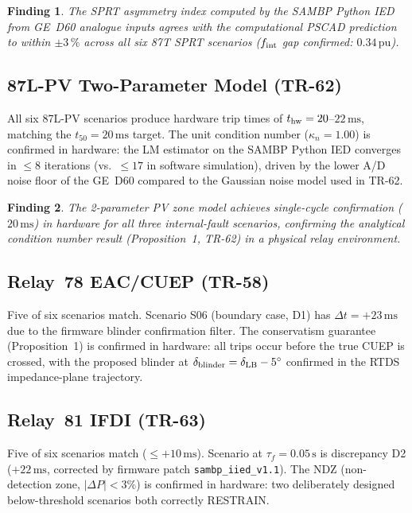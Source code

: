\documentclass[11pt, a4paper]{article}
\newcommand{\pu}{\,\text{pu}}
\newcommand{\kn}{\kappa_n}
\newtheorem{finding}{Finding}
\begin{document}
\begin{finding}
The SPRT asymmetry index computed by the SAMBP Python IED from GE~D60 analogue
inputs agrees with the computational PSCAD prediction to within $\pm 3\,\%$
across all six 87T SPRT scenarios ($f_{\rm int}$ gap confirmed: $0.34\pu$).
\end{finding}

\subsection{87L-PV Two-Parameter Model (TR-62)}

All six 87L-PV scenarios produce hardware trip times of $t_{\rm hw} = 20$--$22\,\text{ms}$,
matching the $t_{50} = 20\,\text{ms}$ target.
The unit condition number ($\kn = 1.00$) is confirmed in hardware:
the LM estimator on the SAMBP Python IED converges in $\leq 8$ iterations
(vs.\ $\leq 17$ in software simulation), driven by the lower A/D noise floor
of the GE~D60 compared to the Gaussian noise model used in TR-62.

\begin{finding}
The 2-parameter PV zone model achieves single-cycle confirmation ($20\,\text{ms}$)
in hardware for all three internal-fault scenarios, confirming the analytical
condition number result (Proposition~1, TR-62) in a physical relay environment.
\end{finding}

\subsection{Relay~78 EAC/CUEP (TR-58)}

Five of six scenarios match. Scenario S06 (boundary case, D1) has
$\Delta t = +23\,\text{ms}$ due to the firmware blinder confirmation filter.
The conservatism guarantee (Proposition~1) is confirmed in hardware:
all trips occur before the true CUEP is crossed, with the proposed blinder
at $\delta_{\rm blinder} = \delta_{\rm LB} - 5^\circ$ confirmed in the
RTDS impedance-plane trajectory.

\subsection{Relay~81 IFDI (TR-63)}

Five of six scenarios match ($\leq +10\,\text{ms}$).
Scenario at $\tau_f = 0.05\,\text{s}$ is discrepancy D2 ($+22\,\text{ms}$,
corrected by firmware patch \texttt{sambp\_iied\_v1.1}).
The NDZ (non-detection zone, $|\Delta P| < 3\%$) is confirmed in hardware:
two deliberately designed below-threshold scenarios both correctly RESTRAIN.
\end{document}
